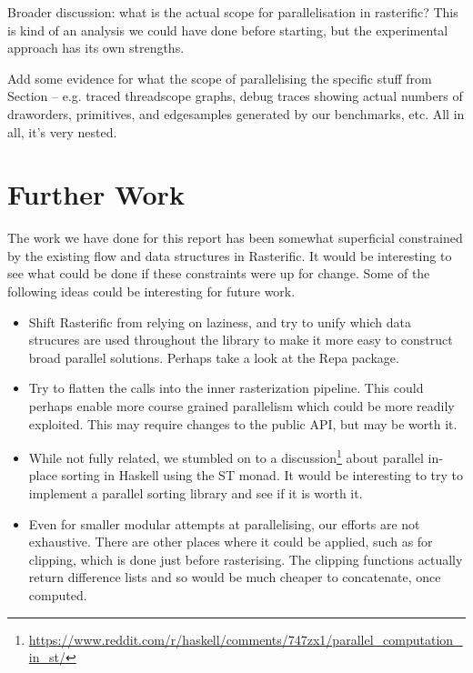 \documentclass[12pt, a4paper]{article}
\begin{document}
Broader discussion: what is the actual scope for parallelisation in rasterific? This is kind of an analysis we could have done before starting, but the experimental approach has its own strengths.

Add some evidence for what the scope of parallelising the specific stuff from Section \label{experiments} -- e.g. traced threadscope graphs, debug traces showing actual numbers of draworders, primitives, and edgesamples generated by our benchmarks, etc. All in all, it's very nested.

\section{Further Work}\label{furtherwork}
The work we have done for this report has been somewhat superficial constrained by the existing flow and data structures in Rasterific.
 It would be interesting to see what could be done if these constraints were up for change. Some of the following ideas could be interesting for future work.
\begin{itemize}
\item Shift Rasterific from relying on laziness, and try to unify which data strucures are used throughout the library to make it more easy to construct
  broad parallel solutions. Perhaps take a look at the Repa package.
\item Try to flatten the calls into the inner rasterization pipeline. This could perhaps enable more course grained parallelism which could be more readily exploited.
  This may require changes to the public API, but may be worth it.
\item While not fully related, we stumbled on to a discussion\footnote{\url{https://www.reddit.com/r/haskell/comments/747zx1/parallel_computation_in_st/}}
  about parallel in-place sorting in Haskell using the ST monad.
  It would be interesting to try to implement a parallel sorting library and see if it is worth it.
  
\item Even for smaller modular attempts at parallelising, our efforts are not exhaustive. There are other places where it could be applied, such as for clipping, which is done just before rasterising. The clipping functions actually return difference lists and so would be much cheaper to concatenate, once computed.
\end{itemize}
\end{document}
